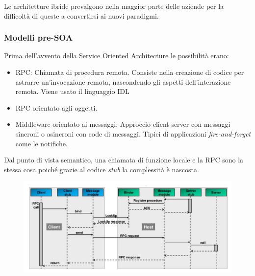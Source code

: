 \documentclass{article}
\begin{document}
		Le architetture ibride prevalgono nella maggior parte delle aziende per la difficoltà di queste a convertirsi ai nuovi paradigmi.
		
		\subsubsection{Modelli pre-SOA}
		
		Prima dell'avvento della Service Oriented Architecture le possibilità erano:
		\begin{itemize}
		    \item RPC: Chiamata di procedura remota. Consiste nella creazione di codice per astrarre un'invocazione remota, nascondendo gli aspetti dell'interazione remota. Viene usato il linguaggio IDL
		    \item RPC orientato agli oggetti.
		    \item Middleware orientato ai messaggi: Approccio client-server con messaggi sincroni o asincroni con code di messaggi. Tipici di applicazioni \textit{fire-and-forget} come le notifiche.
		\end{itemize}
		
		Dal punto di vista semantico, una chiamata di funzione locale e la RPC sono la stessa cosa poiché grazie al codice \emph{stub} la complessità è nascosta.
		
		\begin{figure}[ht]
			\centering
			\includegraphics[width=0.8\linewidth]{SAC_A3_rpc}

			\label{fig:saca3rpc}
		\end{figure}
\end{document}
